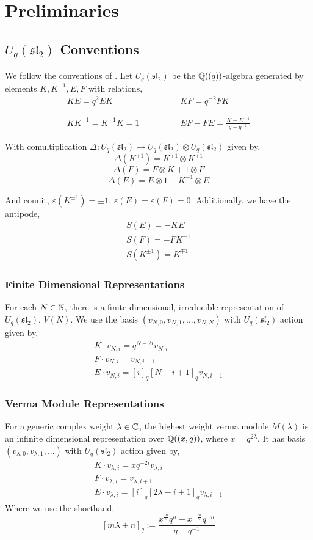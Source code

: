 \documentclass{article}
\begin{document}
\section{Preliminaries}\label{sec: prelim}
\subsection{\texorpdfstring{$U_q(\mathfrak{sl_2})$}{Uq(sl2)} Conventions}
We follow the conventions of \cite{Na}. Let $U_q(\mathfrak{sl}_2)$ be the ${\mathbb Q}((q))$-algebra generated by elements $K,K^{-1},E,F$ with relations, 
$$
\begin{matrix}
    KE =q^2 EK &&&&&& KF = q^{-2}FK\\ \\ \\
    KK^{-1} = K^{-1}K =1 &&&&&& EF-FE = \frac{K-K^{-1}}{q-q^{-1}}
\end{matrix}$$

With comultiplication $\Delta: U_q(\mathfrak{sl_2}) \rightarrow U_q(\mathfrak{sl_2}) \otimes U_q(\mathfrak{sl_2})$ given by, 
$$\Delta(K^{\pm1}) = K^{\pm1}\otimes K^{\pm1}$$
$$\Delta(F) = F\otimes K +1\otimes F$$
$$\Delta(E) = E\otimes 1 +K^{-1}\otimes E$$

And counit, $\varepsilon(K^{\pm1}) = \pm1$, $\varepsilon(E) = \varepsilon(F) =0$. Additionally, we have the antipode, 
\begin{align*}
S(E)=-KE\\
S(F) = -FK^{-1}\\
S(K^{\pm1}) = K^{\mp1 }
\end{align*}
\subsubsection{Finite Dimensional Representations}
For each $N\in {\mathbb N}$, there is a finite dimensional, irreducible representation of $U_q(\mathfrak{sl}_2)$, $V(N)$. We use the basis $(v_{N,0}, v_{N,1},...,v_{N,N})$ with $U_q(\mathfrak{sl}_2)$ action given by, 
\begin{align*}
    K\cdot v_{N,i} = q^{N-2i}v_{N,i}\\
    F\cdot v_{N,i} = v_{N,i+1}\\
    E\cdot v_{N,i} = [i]_q [N-i+1]_qv_{N,i-1}
\end{align*}
\subsubsection{Verma Module Representations}
For a generic complex weight $\lambda \in {\mathbb C}$, the highest weight verma module $M(\lambda)$ is an infinite dimensional representation over ${\mathbb Q}((x,q))$, where $x=q^{2\lambda}$. It has basis $(v_{\lambda, 0}, v_{\lambda,1},...)$ with $U_q(\mathfrak{sl}_2)$ action given by, 
\begin{align*}
    K\cdot v_{\lambda,i} = xq^{-2i}v_{\lambda,i}\\
    F\cdot v_{\lambda,i} = v_{\lambda,i+1}\\
    E\cdot v_{\lambda,i} = [i]_q [2\lambda-i+1]_qv_{\lambda,i-1}
\end{align*}
Where we use the shorthand, 
$$[m \lambda +n]_q := \frac{x^\frac{m}{2} q^n - x^{-\frac{m}{2}} q^{-n}}{q-q^{-1}}$$
\end{document}
